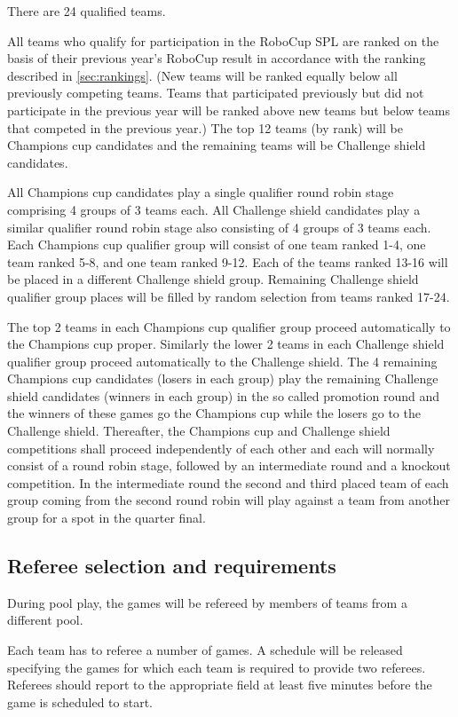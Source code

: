\documentclass[12pt]{article}
\begin{document}
There are 24 qualified teams.

All teams who qualify for participation in the RoboCup SPL are ranked on the basis of their previous year's RoboCup result in accordance with the ranking described in \ref{sec:rankings}. (New teams will be ranked equally below all previously competing teams. Teams that participated previously but did not participate in the previous year will be ranked above new teams but below teams that competed in the previous year.) The top 12 teams (by rank) will be Champions cup candidates and the remaining teams will be Challenge shield candidates.

All Champions cup candidates play a single qualifier round robin stage comprising 4 groups of 3 teams each. All Challenge shield candidates play a similar qualifier round robin stage also consisting of 4 groups of 3 teams each. Each Champions cup qualifier group will consist of one team ranked 1-4, one team ranked 5-8, and one team ranked 9-12. Each of the teams ranked 13-16 will be placed in a different Challenge shield group. Remaining Challenge shield qualifier group places will be filled by random selection from teams ranked 17-24.

The top 2 teams in each Champions cup qualifier group proceed automatically to the Champions cup proper. Similarly the lower 2 teams in each Challenge shield qualifier group proceed automatically to the Challenge shield. The 4 remaining Champions cup candidates (losers in each group) play the remaining Challenge shield candidates (winners in each group) in the so called promotion round and the winners of these games go the Champions cup while the losers go to the Challenge shield. Thereafter, the Champions cup and Challenge shield competitions shall proceed independently of each other and each will normally consist of a round robin stage, followed by an intermediate round and a knockout competition. In the intermediate round the second and third placed team of each group coming from the second round robin will play against a team from another group for a spot in the quarter final.

\subsection{Referee selection and requirements}
\label{sec:refSelection}
During pool play, the games will be refereed by members of teams from a different pool.  

Each team has to referee a number of games. A schedule will be released specifying the games for which each team is required to provide two referees. Referees should report to the appropriate field at least five minutes before the game is scheduled to start.
\end{document}
